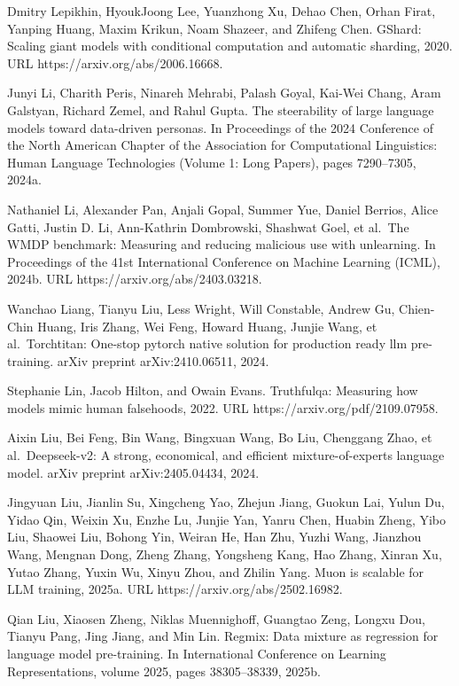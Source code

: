 \documentclass[
  10
]{article}
\begin{document}
Dmitry Lepikhin, HyoukJoong Lee, Yuanzhong Xu, Dehao Chen, Orhan Firat,
Yanping Huang, Maxim Krikun, Noam Shazeer, and Zhifeng Chen. GShard:
Scaling giant models with conditional computation and automatic
sharding, 2020. URL https://arxiv.org/abs/2006.16668.

Junyi Li, Charith Peris, Ninareh Mehrabi, Palash Goyal, Kai-Wei Chang,
Aram Galstyan, Richard Zemel, and Rahul Gupta. The steerability of large
language models toward data-driven personas. In Proceedings of the 2024
Conference of the North American Chapter of the Association for
Computational Linguistics: Human Language Technologies (Volume 1: Long
Papers), pages 7290--7305, 2024a.

Nathaniel Li, Alexander Pan, Anjali Gopal, Summer Yue, Daniel Berrios,
Alice Gatti, Justin D. Li, Ann-Kathrin Dombrowski, Shashwat Goel, et
al.~The WMDP benchmark: Measuring and reducing malicious use with
unlearning. In Proceedings of the 41st International Conference on Machine
Learning (ICML), 2024b. URL https://arxiv.org/abs/2403.03218.

Wanchao Liang, Tianyu Liu, Less Wright, Will Constable, Andrew Gu,
Chien-Chin Huang, Iris Zhang, Wei Feng, Howard Huang, Junjie Wang, et
al.~Torchtitan: One-stop pytorch native solution for production ready
llm pre-training. arXiv preprint arXiv:2410.06511, 2024.

Stephanie Lin, Jacob Hilton, and Owain Evans. Truthfulqa: Measuring how
models mimic human falsehoods, 2022. URL
https://arxiv.org/pdf/2109.07958.



Aixin Liu, Bei Feng, Bin Wang, Bingxuan Wang, Bo Liu, Chenggang Zhao, et
al.~Deepseek-v2: A strong, economical, and efficient mixture-of-experts
language model. arXiv preprint arXiv:2405.04434, 2024.

Jingyuan Liu, Jianlin Su, Xingcheng Yao, Zhejun Jiang, Guokun Lai, Yulun
Du, Yidao Qin, Weixin Xu, Enzhe Lu, Junjie Yan, Yanru Chen, Huabin
Zheng, Yibo Liu, Shaowei Liu, Bohong Yin, Weiran He, Han Zhu, Yuzhi
Wang, Jianzhou Wang, Mengnan Dong, Zheng Zhang, Yongsheng Kang, Hao
Zhang, Xinran Xu, Yutao Zhang, Yuxin Wu, Xinyu Zhou, and Zhilin Yang.
Muon is scalable for LLM training, 2025a. URL
https://arxiv.org/abs/2502.16982.

Qian Liu, Xiaosen Zheng, Niklas Muennighoff, Guangtao Zeng, Longxu Dou,
Tianyu Pang, Jing Jiang, and Min Lin. Regmix: Data mixture as regression
for language model pre-training. In International Conference on Learning
Representations, volume 2025, pages 38305--38339, 2025b.
\end{document}
